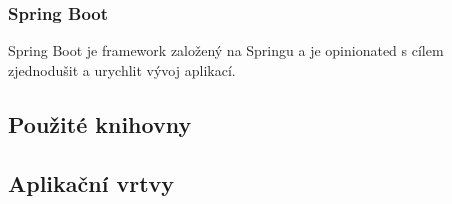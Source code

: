 \subsubsection *{Spring Boot}

Spring Boot je framework založený na Springu a je opinionated s cílem zjednodušit a urychlit vývoj  aplikací.

\subsection {Použité knihovny}

\subsection*{Aplikační vrtvy}



